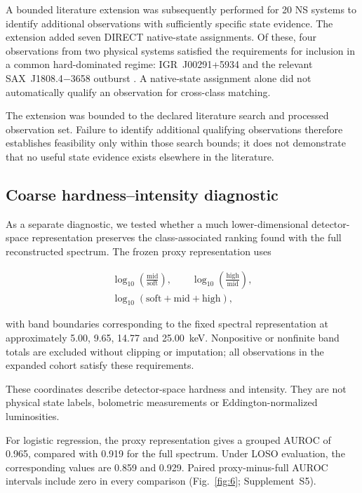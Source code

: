 \documentclass[final,5p,authoryear,nopreprintline]{elsarticle}
\begin{document}
A bounded literature extension was subsequently performed for 20 NS systems to identify additional observations with sufficiently specific state evidence. The extension added seven DIRECT native-state assignments. Of these, four observations from two physical systems satisfied the requirements for inclusion in a common hard-dominated regime: IGR~J00291+5934 \citep{Linares2007,Falanga2005} and the relevant SAX~J1808.4$-$3658 outburst \citep{Bult2015,Ibragimov2009}. A native-state assignment alone did not automatically qualify an observation for cross-class matching.

The extension was bounded to the declared literature search and processed observation set. Failure to identify additional qualifying observations therefore establishes feasibility only within those search bounds; it does not demonstrate that no useful state evidence exists elsewhere in the literature.

\subsection{Coarse hardness--intensity diagnostic}

As a separate diagnostic, we tested whether a much lower-dimensional detector-space representation preserves the class-associated ranking found with the full reconstructed spectrum. The frozen proxy representation uses

\begin{equation}
\begin{gathered}
\log_{10}\left(\frac{\mathrm{mid}}{\mathrm{soft}}\right),
\qquad
\log_{10}\left(\frac{\mathrm{high}}{\mathrm{mid}}\right),
\\
\log_{10}\left(\mathrm{soft}+\mathrm{mid}+\mathrm{high}\right),
\end{gathered}
\end{equation}

with band boundaries corresponding to the fixed spectral representation at approximately 5.00, 9.65, 14.77 and 25.00~keV. Nonpositive or nonfinite band totals are excluded without clipping or imputation; all observations in the expanded cohort satisfy these requirements.

These coordinates describe detector-space hardness and intensity. They are not physical state labels, bolometric measurements or Eddington-normalized luminosities.

For logistic regression, the proxy representation gives a grouped AUROC of 0.965, compared with 0.919 for the full spectrum. Under LOSO evaluation, the corresponding values are 0.859 and 0.929. Paired proxy-minus-full AUROC intervals include zero in every comparison (Fig.~\ref{fig:6}; Supplement~S5).
\end{document}
